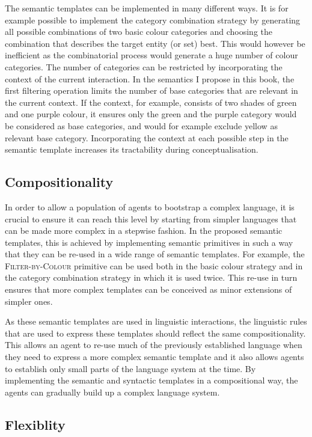 The semantic templates can be implemented in many different ways. It
is for example possible to implement the category combination
  strategy by generating all possible combinations of two basic
colour categories and choosing the combination that describes the
target entity (or set) best. This would however be inefficient as 
the combinatorial process would generate a huge number of colour
categories. The number of categories can be restricted by
incorporating the context of the current interaction. In the semantics
I propose in this book, the first filtering operation limits the
number of base categories that are relevant in the current context. If
the context, for example, consists of two shades of green and one purple
colour, it ensures only the green and the purple category would be
considered as base categories, and would for example exclude yellow as
relevant base category. Incorporating the context at each possible
step in the semantic template increases its tractability during
conceptualisation.

\subsection{Compositionality}

In order to allow a population of agents to bootstrap a complex
language, it is crucial to ensure it can reach this level by starting
from simpler languages that can be made more complex in a stepwise
fashion. In the proposed semantic templates, this is achieved by
implementing semantic primitives in such a way that they can be re-used in a
wide range of semantic templates. For example, the \textsc{Filter-by-Colour}
primitive can be used both in the basic colour
  strategy and in the category combination strategy in
which it is used twice. This re-use in turn ensures that more complex
templates can be conceived as minor extensions of simpler ones.

As these semantic templates are used in linguistic interactions, the
linguistic rules that are used to express these templates should
reflect the same compositionality. This allows an agent to re-use
much of the previously established language when they need to express
a more complex semantic template and it also allows agents to establish only
small parts of the language system at the time. By implementing the
semantic and syntactic templates in a compositional way, the agents
can gradually build up a complex language system.

\subsection{Flexiblity}

